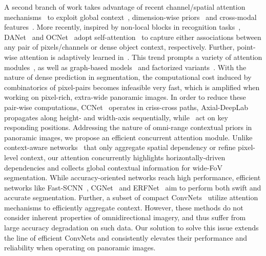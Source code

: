 \documentclass[final]{cvpr}
\begin{document}
A second branch of work takes advantage of recent channel/spatial attention mechanisms~\cite{hu2018squeeze,hu2019acnet,wang2020eca,woo2018cbam} to exploit global context~\cite{li2018pyramid,zhang2018context}, dimension-wise priors~\cite{choi2020cars,yang2021context} and cross-modal features~\cite{sun2020real,xiang2021polarization,zhang2020issafe}.
More recently, inspired by non-local blocks in recognition tasks~\cite{wang2018non}, DANet~\cite{fu2019dual} and OCNet~\cite{yuan2018ocnet} adopt self-attention~\cite{vaswani2017attention} to capture either associations between any pair of pixels/channels or dense object context, respectively.
Further, point-wise attention is adaptively learned in~\cite{zhao2018psanet}. This trend prompts a variety of attention modules~\cite{chen20182,huang2020ordnet,li2019expectation,liu2020covariance},
as well as
graph-based models~\cite{yu2020representative,zhang2019dual}
and factorized variants~\cite{huang2019interlaced,sang2020pcanet,yin2020disentangled}.
With the nature of dense prediction in segmentation, the computational cost induced by combinatorics of pixel-pairs becomes infeasible very fast, which is amplified when working on pixel-rich, extra-wide panoramic images.
In order to reduce these pair-wise computations, CCNet~\cite{huang2019ccnet} operates in criss-cross paths, Axial-DeepLab~\cite{wang2020axial} propagates along height- and width-axis sequentially,
while~\cite{fu2020scene,shen2020ranet,yu2020representative,zhu2019asymmetric} act on key responding positions.
Addressing the nature of omni-range contextual priors in panoramic images, we propose an efficient concurrent attention module.
Unlike context-aware networks~\cite{hou2020strip,huang2019ccnet} that only aggregate spatial dependency or refine pixel-level context, our attention concurrently highlights horizontally-driven dependencies and collects global contextual information for wide-FoV segmentation. 
While accuracy-oriented networks reach high performance,
efficient networks like Fast-SCNN~\cite{poudel2019fast}, CGNet~\cite{wu2018cgnet} and ERFNet~\cite{romera2018erfnet} aim to perform both swift and accurate segmentation.
Further, a subset of compact ConvNets~\cite{wu2018cgnet,yang2020ds,yu2018bisenet} utilize attention mechanisms to efficiently aggregate context.
However, these methods do not consider inherent properties of omnidirectional imagery, and thus suffer from large accuracy degradation on such data.
Our solution to solve this issue extends the line of efficient ConvNets and consistently elevates their performance and reliability when operating on panoramic images.
\end{document}
